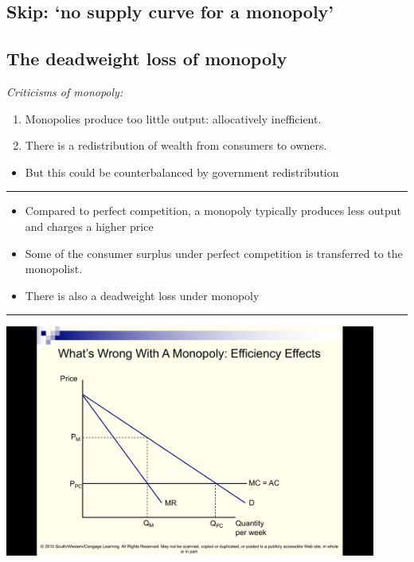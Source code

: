 \documentclass[]{article}
\providecommand{\tightlist}{%
  \setlength{\itemsep}{0pt}\setlength{\parskip}{0pt}}
\begin{document}
\hypertarget{skip-no-supply-curve-for-a-monopoly}{%
\subsection{Skip: `no supply curve for a
monopoly'}\label{skip-no-supply-curve-for-a-monopoly}}

\hypertarget{the-deadweight-loss-of-monopoly}{%
\subsection{The deadweight loss of
monopoly}\label{the-deadweight-loss-of-monopoly}}

\emph{Criticisms of monopoly:}

\begin{enumerate}
\def\labelenumi{\arabic{enumi}.}
\item
  Monopolies produce too little output: allocatively inefficient.
\item
  There is a redistribution of wealth from consumers to owners.
\end{enumerate}

\begin{itemize}
\tightlist
\item
  But this could be counterbalanced by government redistribution
\end{itemize}

\begin{center}\rule{0.5\linewidth}{\linethickness}\end{center}

\begin{itemize}
\item
  Compared to perfect competition, a monopoly typically produces less
  output and charges a higher price
\item
  Some of the consumer surplus under perfect competition is transferred
  to the monopolist.
\item
  There is also a deadweight loss under monopoly
\end{itemize}

\begin{center}\rule{0.5\linewidth}{\linethickness}\end{center}

\includegraphics[height=3in]{picsfigs/dwl1.png}
\end{document}
